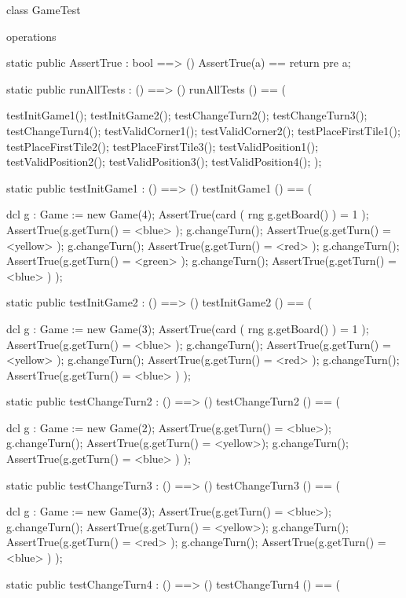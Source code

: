 \begin{vdm_al}
class GameTest

  operations
  
  static public AssertTrue : bool ==> ()
    AssertTrue(a) == return
    pre a;

  static public runAllTests : () ==> ()
    runAllTests () == (
    
      testInitGame1();
      testInitGame2();
      testChangeTurn2();
      testChangeTurn3();
      testChangeTurn4();
      testValidCorner1();
      testValidCorner2();
      testPlaceFirstTile1();
      testPlaceFirstTile2();
      testPlaceFirstTile3();
      testValidPosition1();
      testValidPosition2();
      testValidPosition3();
      testValidPosition4();
    );

  static public testInitGame1 : () ==> ()
  testInitGame1 () == (
    
    dcl g : Game := new Game(4);
    AssertTrue(card ( rng g.getBoard() ) = 1 );
    AssertTrue(g.getTurn() = <blue> );
    g.changeTurn();
    AssertTrue(g.getTurn() = <yellow> );
    g.changeTurn();
    AssertTrue(g.getTurn() = <red> );
    g.changeTurn();
    AssertTrue(g.getTurn() = <green> );
    g.changeTurn();
    AssertTrue(g.getTurn() = <blue> )
  );
  
  static public testInitGame2 : () ==> ()
  testInitGame2 () == (
    
    dcl g : Game := new Game(3);
    AssertTrue(card ( rng g.getBoard() ) = 1 );
    AssertTrue(g.getTurn() = <blue> );
    g.changeTurn();
    AssertTrue(g.getTurn() = <yellow> );
    g.changeTurn();
    AssertTrue(g.getTurn() = <red> );
    g.changeTurn();
    AssertTrue(g.getTurn() = <blue> )
  );
  
  static public testChangeTurn2 : () ==> ()
  testChangeTurn2 () == (
    
    dcl g : Game := new Game(2);
    AssertTrue(g.getTurn() = <blue>);
    g.changeTurn();
    AssertTrue(g.getTurn() = <yellow>);
    g.changeTurn();
    AssertTrue(g.getTurn() = <blue> )
  );
  
  static public testChangeTurn3 : () ==> ()
  testChangeTurn3 () == (
    
    dcl g : Game := new Game(3);
    AssertTrue(g.getTurn() = <blue>);
    g.changeTurn();
    AssertTrue(g.getTurn() = <yellow>);
    g.changeTurn();
    AssertTrue(g.getTurn() = <red> );
    g.changeTurn();
    AssertTrue(g.getTurn() = <blue> )
  );
  
  static public testChangeTurn4 : () ==> ()
  testChangeTurn4 () == (
    

\end{vdm_al}
